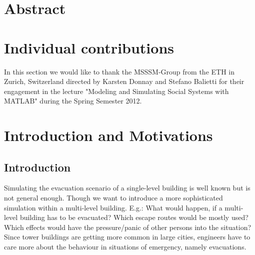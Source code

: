 \documentclass[11pt]{article}
\begin{document}






\tableofcontents

\newpage




\section{Abstract}


\section{Individual contributions}

In this section we would like to thank the MSSSM-Group from the ETH in Zurich, Switzerland directed by Karsten Donnay and Stefano Balietti for their engagement in the lecture "Modeling and Simulating Social Systems with MATLAB" during the Spring Semester 2012.

\section{Introduction and Motivations}

\subsection{Introduction}

Simulating the evacuation scenario of a single-level building is well known but is not general enough. Though we want to introduce a more sophisticated simulation within a multi-level building. E.g.: What would happen, if a multi-level building has to be evacuated? Which escape routes would be mostly used? Which effects would have the pressure/panic of other persons into the situation? Since tower buildings are getting more common in large cities, engineers have to care more about the behaviour in situations of emergency, namely evacuations. 
\end{document}
